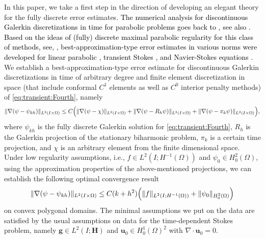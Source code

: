 \documentclass{m2an}
\newcommand{\1}{\mathds{1}}
\newcommand{\uu}{\mathbf{u}}
\newcommand{\g}{\mathbf{g}}
\newcommand{\f}{\vec{f}}
\newcommand{\Om}{\Omega}
\newcommand{\revB}[1]{\textcolor{black}{#1}}
\DeclarePairedDelimiter{\norm}{\lVert}{\rVert}
\newcommand{\na}{\nabla}
\newcommand{\curl}{\operatorname{curl}}
\renewcommand{\H}{\mathbf{H}}
\theoremstyle{definition}
\begin{document}
In this paper, we take a first step in the direction of developing an elegant theory for the fully discrete error estimates. %
\revB{The numerical analysis for discontinuous Galerkin discretizations in time for parabolic problems goes back to \cite{jamet_galerkin_type_1978,ErikssonJohnsonThomee:1985}, see also \cite{LarssoThomeeWahlbin:1998}.
Based on the ideas of (fully) discrete maximal parabolic regularity for this class of methods, see, \cite{LeykekhmanD_VexlerB_2017a,LeykekhmanVexler:2018SINUM}, best-approximation-type error estimates in various norms were developed for linear parabolic \cite{LeykekhmanD_VexlerB_2016a,LeykekhmanVexler:2017SINUM_Gradient}, transient Stokes \cite{Behringer_Leykekhman_Vexler_2022,LeykekhmanVexler:2024Calcolo}, and Navier-Stokes equations \cite{VexlerWagner:2024M2AN}.}
We establish a best-approximation-type error estimate  for discontinuous Galerkin discretizations in time of arbitrary degree and finite element discretization in space  (that include conformal $C^1$ elements as well as $C^0$ interior penalty methods) of \eqref{eq:transient:Fourth}, namely
\begin{equation}\label{eq:psi:best_approx_intro}
      \norm{\na(\psi-\psi_{{k}h})}_{L^2(I\times\Om)} 
      \leq C  \Big(\norm{\na(\psi-{\chi})}_{L^2(I\times\Om)} 
          +  \norm{\na(\psi - R_h\psi)}_{L^2(I\times\Om)}
      +   \norm{\na(\psi - \pi_k\psi)}_{L^2(I\times\Om)} \Big), %
\end{equation}
where $\psi_{kh}$ is the fully  discrete Galerkin solution for \eqref{eq:transient:Fourth}, $R_h$ is the Galerkin projection of the stationary biharmonic problem, $\pi_k$ is a certain time projection, and  $\chi$ is an arbitrary element from the finite dimensional space. 
Under low regularity assumptions, i.e., $f \in L^2(I;H^{-1}(\Om))$ and $\psi_0 \in H^2_0(\Om)$, 
using the approximation properties of the above-mentioned projections, we can establish the following  optimal convergence result 
\begin{equation}\label{eq:psi:rates}
    \norm{\na(\psi-\psi_{kh})}_{L^2(I\times\Om)} 
    \leq C  (k+h^2 )\Big(
     \|f\|_{L^{2}(I;H^{-1}(\Omega))}+\|\psi_0\|_{H^2_0(\Om)}
  \Big) 
\end{equation}
on convex polygonal domains.
The minimal assumptions we put on the data are satisfied by the usual assumptions on data for the time-dependent Stokes problem, namely $\g \in L^2(I;\H)$ and $\uu_0 \in H^1_0(\Om)^2$ with $\nabla \cdot \uu_0 = 0$.
\end{document}
